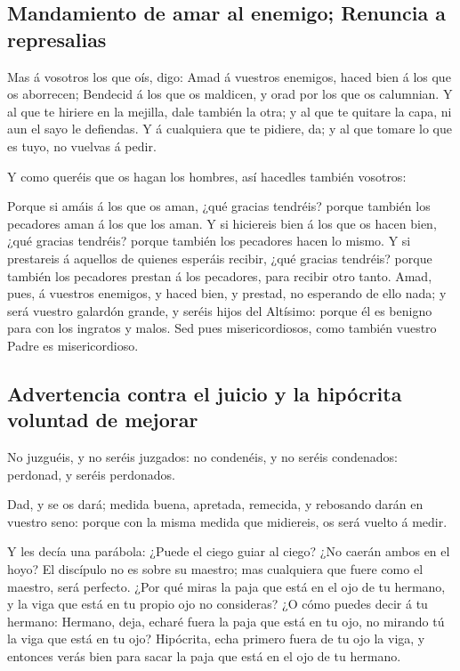\hypertarget{mandamiento-de-amar-al-enemigo-renuncia-a-represalias}{%
\subsection{Mandamiento de amar al enemigo; Renuncia a
represalias}\label{mandamiento-de-amar-al-enemigo-renuncia-a-represalias}}

 Mas á vosotros los que oís, digo: Amad á vuestros
enemigos, haced bien á los que os aborrecen;  Bendecid á
los que os maldicen, y orad por los que os calumnian.  Y
al que te hiriere en la mejilla, dale también la otra; y al que te
quitare la capa, ni aun el sayo le defiendas.  Y á
cualquiera que te pidiere, da; y al que tomare lo que es tuyo, no
vuelvas á pedir.

 Y como queréis que os hagan los hombres, así hacedles
también vosotros:

 Porque si amáis á los que os aman, ¿qué gracias
tendréis? porque también los pecadores aman á los que los aman.
 Y si hiciereis bien á los que os hacen bien, ¿qué
gracias tendréis? porque también los pecadores hacen lo mismo.
 Y si prestareis á aquellos de quienes esperáis recibir,
¿qué gracias tendréis? porque también los pecadores prestan á los
pecadores, para recibir otro tanto.  Amad, pues, á
vuestros enemigos, y haced bien, y prestad, no esperando de ello nada; y
será vuestro galardón grande, y seréis hijos del Altísimo: porque él es
benigno para con los ingratos y malos.  Sed pues
misericordiosos, como también vuestro Padre es misericordioso.

\hypertarget{advertencia-contra-el-juicio-y-la-hipuxf3crita-voluntad-de-mejorar}{%
\subsection{Advertencia contra el juicio y la hipócrita voluntad de
mejorar}\label{advertencia-contra-el-juicio-y-la-hipuxf3crita-voluntad-de-mejorar}}

 No juzguéis, y no seréis juzgados: no condenéis, y no
seréis condenados: perdonad, y seréis perdonados.

 Dad, y se os dará; medida buena, apretada, remecida, y
rebosando darán en vuestro seno: porque con la misma medida que
midiereis, os será vuelto á medir.

 Y les decía una parábola: ¿Puede el ciego guiar al
ciego? ¿No caerán ambos en el hoyo?  El discípulo no es
sobre su maestro; mas cualquiera que fuere como el maestro, será
perfecto.  ¿Por qué miras la paja que está en el ojo de
tu hermano, y la viga que está en tu propio ojo no consideras?
 ¿O cómo puedes decir á tu hermano: Hermano, deja, echaré
fuera la paja que está en tu ojo, no mirando tú la viga que está en tu
ojo? Hipócrita, echa primero fuera de tu ojo la viga, y entonces verás
bien para sacar la paja que está en el ojo de tu hermano.

